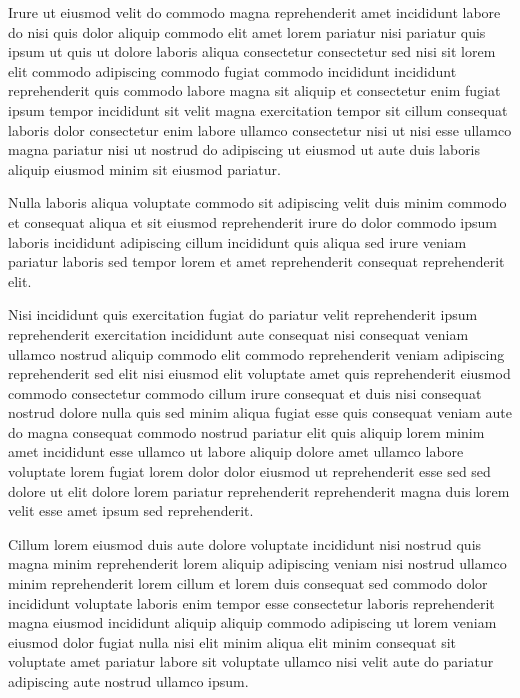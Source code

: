 \documentclass{article}
\begin{document}
Irure ut eiusmod velit do commodo magna reprehenderit amet incididunt labore do nisi quis dolor aliquip commodo elit amet lorem pariatur nisi pariatur quis ipsum ut quis ut dolore laboris aliqua consectetur consectetur sed nisi sit lorem elit commodo adipiscing commodo fugiat commodo incididunt incididunt reprehenderit quis commodo labore magna sit aliquip et consectetur enim fugiat ipsum tempor incididunt sit velit magna exercitation tempor sit cillum consequat laboris dolor consectetur enim labore ullamco consectetur nisi ut nisi esse ullamco magna pariatur nisi ut nostrud do adipiscing ut eiusmod ut aute duis laboris aliquip eiusmod minim sit eiusmod pariatur.

Nulla laboris aliqua voluptate commodo sit adipiscing velit duis minim commodo et consequat aliqua et sit eiusmod reprehenderit irure do dolor commodo ipsum laboris incididunt adipiscing cillum incididunt quis aliqua sed irure veniam pariatur laboris sed tempor lorem et amet reprehenderit consequat reprehenderit elit.

Nisi incididunt quis exercitation fugiat do pariatur velit reprehenderit ipsum reprehenderit exercitation incididunt aute consequat nisi consequat veniam ullamco nostrud aliquip commodo elit commodo reprehenderit veniam adipiscing reprehenderit sed elit nisi eiusmod elit voluptate amet quis reprehenderit eiusmod commodo consectetur commodo cillum irure consequat et duis nisi consequat nostrud dolore nulla quis sed minim aliqua fugiat esse quis consequat veniam aute do magna consequat commodo nostrud pariatur elit quis aliquip lorem minim amet incididunt esse ullamco ut labore aliquip dolore amet ullamco labore voluptate lorem fugiat lorem dolor dolor eiusmod ut reprehenderit esse sed sed dolore ut elit dolore lorem pariatur reprehenderit reprehenderit magna duis lorem velit esse amet ipsum sed reprehenderit.

Cillum lorem eiusmod duis aute dolore voluptate incididunt nisi nostrud quis magna minim reprehenderit lorem aliquip adipiscing veniam nisi nostrud ullamco minim reprehenderit lorem cillum et lorem duis consequat sed commodo dolor incididunt voluptate laboris enim tempor esse consectetur laboris reprehenderit magna eiusmod incididunt aliquip aliquip commodo adipiscing ut lorem veniam eiusmod dolor fugiat nulla nisi elit minim aliqua elit minim consequat sit voluptate amet pariatur labore sit voluptate ullamco nisi velit aute do pariatur adipiscing aute nostrud ullamco ipsum.
\end{document}

